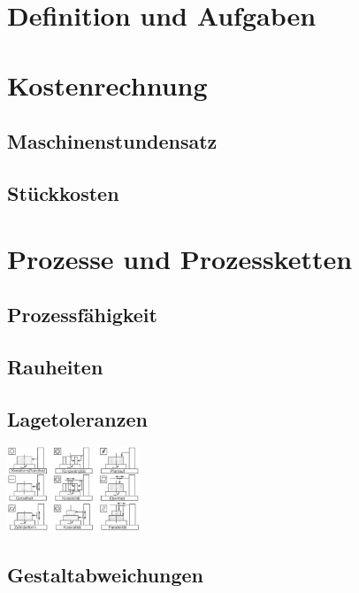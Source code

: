 \documentclass[12pt]{cheatsheet}
\author{Gian Maria Ernst - ernstg\\  \vspace*{0.2em} \normalsize{Based on the work by F. Spengler} \vspace*{-0.2em}}\doctitle{Fertigunstechnik}
\begin{document}
\small

\section*{Definition und Aufgaben}
    

\section*{Kostenrechnung}
    \subsection*{Maschinenstundensatz}
    
    \subsection*{Stückkosten}
    
    \vfill \null \columnbreak

\section*{Prozesse und Prozessketten}
    
    
    \subsection*{Prozessfähigkeit}
    
    \subsection*{Rauheiten}
    
    \subsection*{Lagetoleranzen}
    \includegraphics[width = 40mm]{src/images/lagetoleranzen.png}
    \subsection*{Gestaltabweichungen}
    
\end{document}
